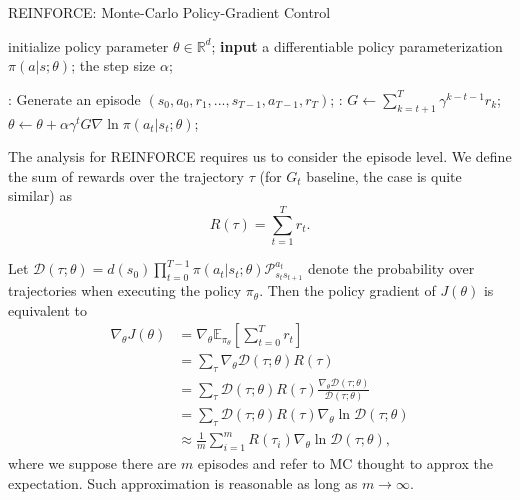 \documentclass{progartcn}
\begin{document}
		\begin{algorithm}[h]
		\caption{REINFORCE: Monte-Carlo Policy-Gradient Control}
		\label{alg: REINFORCE: Monte-Carlo Policy-Gradient Control}
		\begin{algorithmic}[1]
			\State initialize policy parameter $\theta\in\mathbb{R}^{d}$; 
            \State \textbf{input} a differentiable policy parameterization $\pi(a|s;\theta)$; the step size $\alpha$;
            
            :
            	\State Generate an episode $(s_0,a_0,r_1,...,s_{T-1},a_{T-1},r_T)$;
            	:
            	\State $G\gets \sum_{k=t+1}^{T} \gamma^{k-t-1}r_k$;
            	\State $\theta\gets\theta+\alpha\gamma^tG\nabla\ln \pi(a_t|s_t;\theta)$;
            	\EndFor
            \EndFor
        \end{algorithmic}
        \end{algorithm}

        The analysis for REINFORCE requires us to consider the episode level. We define the sum of rewards over the trajectory $\tau$ (for $G_t$ baseline, the case is quite similar) as
		\[R(\tau)=\sum_{t=1}^T r_t.\]

		Let $\mathcal{D}(\tau;\theta)=d(s_0)\prod_{t=0}^{T-1}\pi(a_t|s_t;\theta)\mathcal{P}_{s_ts_{t+1}}^{a_t}$ denote the probability over trajectories when executing the policy $\pi_\theta$. Then the policy gradient of $J(\theta)$ is equivalent to
		\[\begin{split}
		\nabla_\theta J(\theta)&= \nabla_\theta \mathbb{E}_{\pi_\theta}\left[\sum_{t=0}^T r_t\right]\\
		&=\sum_{\tau} \nabla_{\theta} \mathcal{D}(\tau ; \theta) R(\tau) \\
		&=\sum_{\tau} \mathcal{D}(\tau ; \theta) R(\tau) \frac{\nabla_{\theta} \mathcal{D}(\tau ; \theta)}{\mathcal{D}(\tau ; \theta)} \\ 
		&=\sum_{\tau} \mathcal{D}(\tau ; \theta) R(\tau) \nabla_{\theta} \ln \mathcal{D}(\tau ; \theta)\\
		&\approx \frac{1}{m}\sum_{i=1}^m R(\tau_i)\nabla_{\theta}\ln\mathcal{D}(\tau;\theta),
		\end{split}
		\]
		where we suppose there are $m$ episodes and refer to MC thought to approx the expectation. Such approximation is reasonable as long as $m\to\infty$.\\
\end{document}
